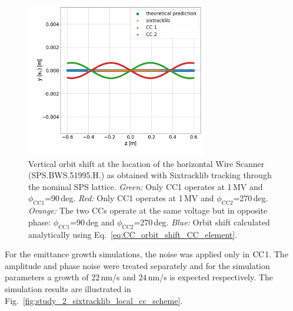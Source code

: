 \begin{figure}[!h]
    \centering         
    \includegraphics[width=0.7\textwidth]{images/Ch6/Vcc_orbit_shift_CC1_CC2.png}
        \caption{Vertical orbit shift at the location of the horizontal Wire Scanner (SPS.BWS.51995.H.) as obtained with Sixtracklib tracking through the nominal SPS lattice. \textit{Green:} Only CC1 operates at 1\,MV and $\phi_\mathrm{CC1}$=90\,deg. \textit{Red:} Only CC1 operates at 1\,MV and $\phi_\mathrm{CC2}$=270\,deg. \textit{Orange:} The two CCs operate at the same voltage but in opposite phase: $\phi_\mathrm{CC1}$=90\,deg and  $\phi_\mathrm{CC2}$=270\,deg. \textit{Blue:} Orbit shift calculated analytically using Eq.~\eqref{eq:CC_orbit_shift_CC_element}.}
        \label{fig:sixtracklib_CC1_vs_CC2_orbit_shift_vs_theory}
\end{figure}

For the emittance growth simulations, the noise was applied only in ${\mathrm{CC}}$1. The amplitude and phase noise were treated separately and for the simulation parameters a growth of $22$\,nm/s and $24$\,nm/s is expected respectively. The simulation results are illustrated in Fig.~\ref{fig:study_2_sixtracklib_local_cc_scheme}.

